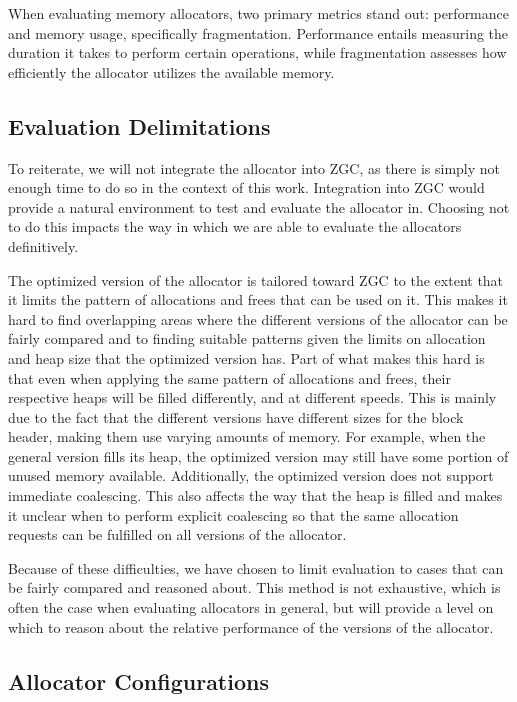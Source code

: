 
When evaluating memory allocators, two primary metrics stand out: performance and memory usage, specifically fragmentation. Performance entails measuring the duration it takes to perform certain operations, while fragmentation assesses how efficiently the allocator utilizes the available memory.

\subsection{Evaluation Delimitations}

To reiterate, we will not integrate the allocator into ZGC, as there is simply not enough time to do so in the context of this work. Integration into ZGC would provide a natural environment to test and evaluate the allocator in. Choosing not to do this impacts the way in which we are able to evaluate the allocators definitively.

The optimized version of the allocator is tailored toward ZGC to the extent that it limits the pattern of allocations and frees that can be used on it. This makes it hard to find overlapping areas where the different versions of the allocator can be fairly compared and to finding suitable patterns given the limits on allocation and heap size that the optimized version has. Part of what makes this hard is that even when applying the same pattern of allocations and frees, their respective heaps will be filled differently, and at different speeds. This is mainly due to the fact that the different versions have different sizes for the block header, making them use varying amounts of memory. For example, when the general version fills its heap, the optimized version may still have some portion of unused memory available. Additionally, the optimized version does not support immediate coalescing. This also affects the way that the heap is filled and makes it unclear when to perform explicit coalescing so that the same allocation requests can be fulfilled on all versions of the allocator.

Because of these difficulties, we have chosen to limit evaluation to cases that can be fairly compared and reasoned about. This method is not exhaustive, which is often the case when evaluating allocators in general, but will provide a level on which to reason about the relative performance of the versions of the allocator.

\subsection{Allocator Configurations}

